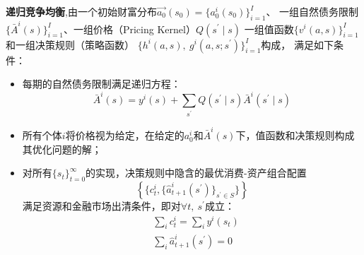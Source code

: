\begin{definition}
    \textbf{递归竞争均衡},由一个初始财富分布$\vec{a_0}\left(s_0\right)=\{a_0^i\left(s_0\right)\}_{i=1}^I$、
    一组自然债务限制$\{\bar{A}^i\left(s\right)\}_{i=1}^I$、一组价格（Pricing Kernel）$Q\left(s^{\prime}\mid s\right)$
    一组值函数$\{v^i\left(a,s\right)\}_{i=1}^I$和一组决策规则（策略函数）
    $\{h^i\left(a,s\right),~g^i\left(a,s;s^{\prime}\right)\}_{i=1}^I$构成，
    满足如下条件：
    \begin{itemize}
        \item 每期的自然债务限制满足递归方程：
            \begin{equation}
                \bar{A}^i(s)=
                    y^i(s)+\sum_{s^{\prime}} Q\left(s^{\prime} \mid s\right) \bar{A}^i\left(s^{\prime} \mid s\right)
            \end{equation}
        \item 所有个体$i$将价格视为给定，在给定的$a_0^i$和$\bar{A}^i\left(s\right)$下，值函数和决策规则构成其优化问题的解；
        \item 对所有$\{s_t\}_{t=0}^{\infty}$的实现，决策规则中隐含的最优消费-资产组合配置
            $$\left\{ \{ c_t^i,\{ \hat{a}_{t+1}^i\left(s^{\prime}\right) \}_{s^{\prime}\in S} \} \right\}$$
            满足资源和金融市场出清条件，即对$\forall t,~ s^{\prime}$成立：
            \begin{equation*}
                \begin{aligned}
                    &\sum_{i}c_t^i =\sum_{i}y^i\left(s_t\right) \\
                    &\sum_{i}\hat{a}_{t+1}^i\left(s^{\prime}\right)= 0
                \end{aligned}
            \end{equation*}
    \end{itemize}
\end{definition}